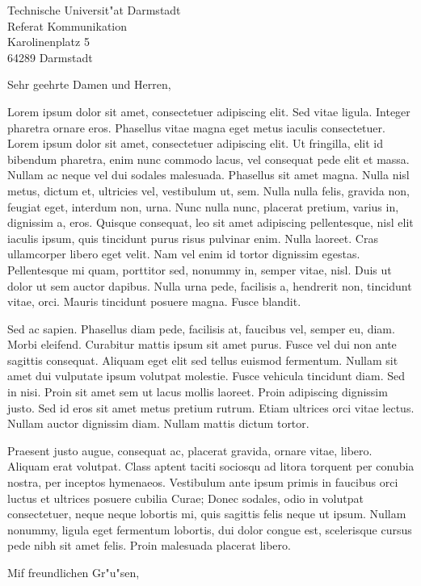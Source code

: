 \documentclass[adr=clemens,accentcolor=tud9c,twoside]{tudletter}
\begin{document}
\begin{letter}{%
    Technische Universit"at Darmstadt\\%
    Referat Kommunikation\\%
    Karolinenplatz 5\\%
    64289 Darmstadt}
  \opening{Sehr geehrte Damen und Herren,}
    Lorem ipsum dolor sit amet, consectetuer adipiscing elit. Sed vitae ligula. Integer pharetra
    ornare eros. Phasellus vitae magna eget metus iaculis consectetuer. Lorem ipsum dolor sit amet,
    consectetuer adipiscing elit. Ut fringilla, elit id bibendum pharetra, enim nunc commodo lacus,
    vel consequat pede elit et massa. Nullam ac neque vel dui sodales malesuada. Phasellus sit amet
    magna. Nulla nisl metus, dictum et, ultricies vel, vestibulum ut, sem. Nulla nulla felis,
    gravida non, feugiat eget, interdum non, urna. Nunc nulla nunc, placerat pretium, varius in,
    dignissim a, eros. Quisque consequat, leo sit amet adipiscing pellentesque, nisl elit iaculis
    ipsum, quis tincidunt purus risus pulvinar enim. Nulla laoreet. Cras ullamcorper libero eget
    velit. Nam vel enim id tortor dignissim egestas. Pellentesque mi quam, porttitor sed, nonummy
    in, semper vitae, nisl. Duis ut dolor ut sem auctor dapibus. Nulla urna pede, facilisis a,
    hendrerit non, tincidunt vitae, orci. Mauris tincidunt posuere magna. Fusce blandit.

    Sed ac sapien. Phasellus diam pede, facilisis at, faucibus vel, semper eu, diam. Morbi
    eleifend. Curabitur mattis ipsum sit amet purus. Fusce vel dui non ante sagittis consequat.
    Aliquam eget elit sed tellus euismod fermentum. Nullam sit amet dui vulputate ipsum volutpat
    molestie. Fusce vehicula tincidunt diam. Sed in nisi. Proin sit amet sem ut lacus mollis
    laoreet. Proin adipiscing dignissim justo. Sed id eros sit amet metus pretium rutrum. Etiam
    ultrices orci vitae lectus. Nullam auctor dignissim diam. Nullam mattis dictum tortor.

    Praesent justo augue, consequat ac, placerat gravida, ornare vitae, libero. Aliquam erat
    volutpat. Class aptent taciti sociosqu ad litora torquent per conubia nostra, per inceptos
    hymenaeos. Vestibulum ante ipsum primis in faucibus orci luctus et ultrices posuere cubilia
    Curae; Donec sodales, odio in volutpat consectetuer, neque neque lobortis mi, quis sagittis
    felis neque ut ipsum. Nullam nonummy, ligula eget fermentum lobortis, dui dolor congue est,
    scelerisque cursus pede nibh sit amet felis. Proin malesuada placerat libero.
  \closing{Mif freundlichen Gr"u"sen,}
\end{letter}
\end{document}
